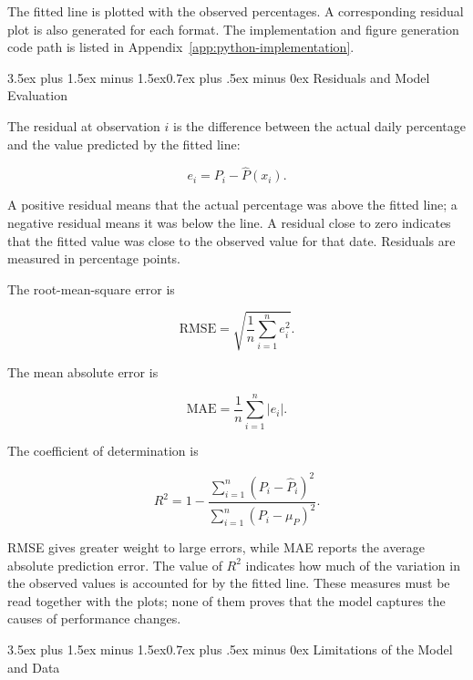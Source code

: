 \documentclass[journal]{IEEEtran}
\makeatletter
\renewcommand\subsection{\@startsection{subsection}{2}{\z@}%
  {3.5ex plus 1.5ex minus 1.5ex}{0.7ex plus .5ex minus 0ex}%
  {\normalfont\normalsize\bfseries\upshape\color{red}}}
\numberwithin{equation}{subsection}
\makeatother
\begin{document}
The fitted line is plotted with the observed percentages.
A corresponding residual plot is also generated for each
format. The implementation and figure generation code path is
listed in Appendix~\ref{app:python-implementation}.

\subsection{Residuals and Model Evaluation}

The residual at observation \(i\) is the difference between
the actual daily percentage and the value predicted by the
fitted line:

\begin{equation}
e_i=P_i-\widehat{P}(x_i).
\label{eq:residual}
\end{equation}

A positive residual means that the actual percentage was
above the fitted line; a negative residual means it was below
the line. A residual close to zero indicates that the fitted
value was close to the observed value for that date. Residuals
are measured in percentage points.

The root-mean-square error is

\begin{equation}
\mathrm{RMSE}=\sqrt{\frac{1}{n}\sum_{i=1}^{n}e_i^2}.
\label{eq:rmse}
\end{equation}

The mean absolute error is

\begin{equation}
\mathrm{MAE}=\frac{1}{n}\sum_{i=1}^{n}|e_i|.
\label{eq:mae}
\end{equation}

The coefficient of determination is

\begin{equation}
R^2=1-\frac{\sum_{i=1}^{n}(P_i-\widehat{P}_i)^2}
{\sum_{i=1}^{n}(P_i-\mu_P)^2}.
\label{eq:r-squared}
\end{equation}

RMSE gives greater weight to large errors, while MAE reports
the average absolute prediction error. The value of \(R^2\)
indicates how much of the variation in the observed values is
accounted for by the fitted line. These measures must be read
together with the plots; none of them proves that the model
captures the causes of performance changes.

\subsection{Limitations of the Model and Data}
\end{document}
